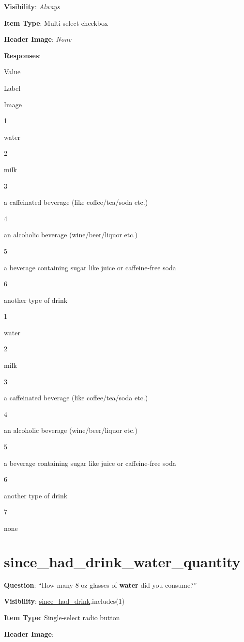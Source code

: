 \documentclass[]{book}
\begin{document}
\textbf{Visibility}: \emph{Always}

\textbf{Item Type}: Multi-select checkbox

\textbf{Header Image}: \emph{None}

\textbf{Responses}:

Value

Label

Image

1

water

2

milk

3

a caffeinated beverage (like coffee/tea/soda etc.)

4

an alcoholic beverage (wine/beer/liquor etc.)

5

a beverage containing sugar like juice or caffeine-free soda

6

another type of drink

1

water

2

milk

3

a caffeinated beverage (like coffee/tea/soda etc.)

4

an alcoholic beverage (wine/beer/liquor etc.)

5

a beverage containing sugar like juice or caffeine-free soda

6

another type of drink

7

none

\hypertarget{since_had_drink_water_quantity}{%
\section{since\_had\_drink\_water\_quantity}\label{since_had_drink_water_quantity}}

\textbf{Question}: ``How many 8 oz glasses of \textbf{water} did you consume?''

\textbf{Visibility}: \protect\hyperlink{since_had_drink}{since\_had\_drink}.includes(1)

\textbf{Item Type}: Single-select radio button

\textbf{Header Image}:
\end{document}
